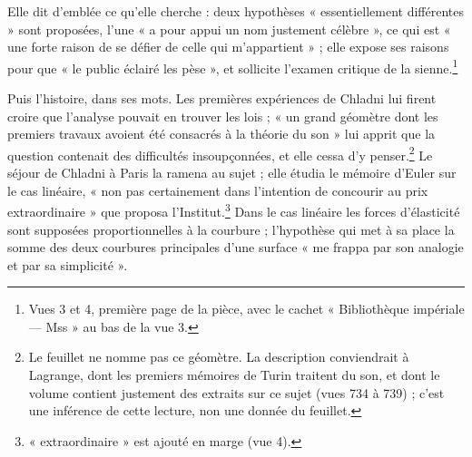 \documentclass[11pt,a4paper]{article}
\begin{document}
Elle dit d'emblée ce qu'elle cherche : deux hypothèses « essentiellement
différentes » sont proposées, l'une « a pour appui un nom justement célèbre »,
ce qui est « une forte raison de se défier de celle qui m'appartient » ; elle
expose ses raisons pour que « le public éclairé les pèse », et sollicite
l'examen critique de la sienne.\footnote{Vues 3 et 4, première page de la pièce,
avec le cachet « Bibliothèque impériale — Mss » au bas de la vue 3.}

Puis l'histoire, dans ses mots. Les premières expériences de Chladni lui
firent croire que l'analyse pouvait en trouver les lois ; « un grand géomètre
dont les premiers travaux avoient été consacrés à la théorie du son » lui
apprit que la question contenait des difficultés insoupçonnées, et elle cessa
d'y penser.\footnote{Le feuillet ne nomme pas ce géomètre. La description
conviendrait à Lagrange, dont les premiers mémoires de Turin traitent du son,
et dont le volume contient justement des extraits sur ce sujet (vues 734 à
739) ; c'est une inférence de cette lecture, non une donnée du feuillet.} Le
séjour de Chladni à Paris la ramena au sujet ; elle étudia le mémoire d'Euler
sur le cas linéaire, « non pas certainement dans l'intention de concourir au
prix extraordinaire » que proposa l'Institut.\footnote{« extraordinaire » est
ajouté en marge (vue 4).} Dans le cas linéaire les forces d'élasticité sont
supposées proportionnelles à la courbure ; l'hypothèse qui met à sa place la
somme des deux courbures principales d'une surface « me frappa par son
analogie et par sa simplicité ».
\end{document}
